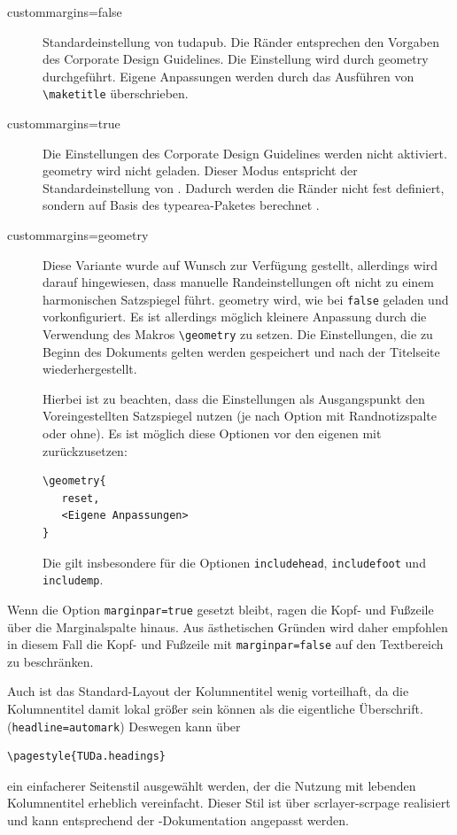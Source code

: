 \documentclass[
	ngerman,%
	accentcolor=9c,%
]{tudapub}
\newcommand*{\code}[1]{\texttt{#1}}
\newcommand*{\pkg}[1]{\textsf{#1}}
\newcommand*{\cls}[1]{\textsf{#1}}
\begin{document}
\begin{description}
	\item[custommargins=false] Standardeinstellung von \cls{tudapub}. Die Ränder entsprechen den Vorgaben des Corporate Design Guidelines. Die Einstellung wird durch \pkg{geometry} durchgeführt. Eigene Anpassungen werden durch das Ausführen von \code{\textbackslash{}maketitle} überschrieben.
	\item[custommargins=true] Die Einstellungen des Corporate Design Guidelines werden nicht aktiviert. \pkg{geometry} wird nicht geladen. Dieser Modus entspricht der Standardeinstellung von \KOMAScript{}. Dadurch werden die Ränder nicht fest definiert, sondern auf Basis des \pkg{typearea}-Paketes berechnet \cite[vgl.][]{scrguide}.
	\item[custommargins=geometry]  Diese Variante wurde auf Wunsch zur Verfügung gestellt, allerdings wird darauf hingewiesen, dass manuelle Randeinstellungen oft nicht zu einem harmonischen Satzspiegel führt.
	      \pkg{geometry} wird, wie bei \code{false} geladen und vorkonfiguriert. Es ist allerdings möglich kleinere Anpassung durch die Verwendung des Makros \code{\textbackslash{}geometry} zu setzen. Die Einstellungen, die zu Beginn des Dokuments gelten werden gespeichert und nach der Titelseite wiederhergestellt.

	      Hierbei ist zu beachten, dass die Einstellungen als Ausgangspunkt den Voreingestellten Satzspiegel nutzen (je nach Option mit Randnotizspalte oder ohne). Es ist möglich diese Optionen vor den eigenen mit zurückzusetzen:
\begin{verbatim}
\geometry{
   reset,
   <Eigene Anpassungen>
}
\end{verbatim}
	      Die gilt insbesondere für die Optionen \code{includehead}, \code{includefoot} und \code{includemp}.
\end{description}

Wenn die Option \code{marginpar=true} gesetzt bleibt, ragen die Kopf- und Fußzeile über die Marginalspalte hinaus. Aus ästhetischen Gründen wird daher empfohlen in diesem Fall die Kopf- und Fußzeile  mit \code{marginpar=false}  auf den Textbereich zu beschränken.

Auch ist das Standard-Layout der Kolumnentitel wenig vorteilhaft, da die Kolumnentitel damit lokal größer sein können als die eigentliche Überschrift. (\code{headline=automark})
Deswegen kann über
\begin{verbatim}
\pagestyle{TUDa.headings}
\end{verbatim}
ein einfacherer Seitenstil ausgewählt werden, der die Nutzung mit lebenden Kolumnentitel erheblich vereinfacht. Dieser Stil ist über \pkg{scrlayer-scrpage} realisiert und kann entsprechend der \KOMAScript{}-Dokumentation angepasst werden.
\end{document}
